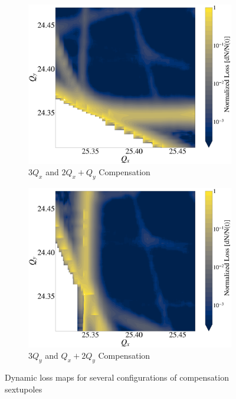 \begin{figure}[H]
\begin{subfigure}{.49\textwidth}
      \includegraphics[width=0.98\linewidth]{chapter4/3qx_2qxqy.png}
      \caption{$3Q_x$ and $2Q_x+Q_y$ Compensation}
      \label{fig:sfig5}
    \end{subfigure}
    \hfill
    \begin{subfigure}{.49\textwidth}
      \includegraphics[width=0.98\linewidth]{chapter4/3qy_qx2qy.png}
      \caption{$3Q_y$ and $Q_x+2Q_y$ Compensation}
      \label{fig:sfig6}
    \end{subfigure}
    
    \caption{Dynamic loss maps for several configurations of compensation sextupoles}
    \label{fig:lossmaps}
    \end{figure} 
\newpage


